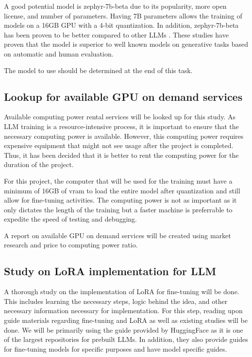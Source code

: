 A good potential model is zephyr-7b-beta due to its popularity, more open license, and number of parameters.
Having 7B parameters allows the training of models on a 16GB GPU with a 4-bit quantization.
In addition, zephyr-7b-beta has been proven to be better compared to other LLMs \cite{Zhu_2023} \cite{zhao2024loraland310finetuned}.
These studies have proven that the model is superior to well known models on generative tasks based on automatic and human evaluation.

The model to use should be determined at the end of this task.

\subsection{Lookup for available GPU on demand services} 
Available computing power rental services will be looked up for this study.
As LLM training is a resource-intensive process, it is important to ensure that the necessary computing power is available.
However, this computing power requires expensive equipment that might not see usage after the project is completed.
Thus, it has been decided that it is better to rent the computing power for the duration of the project.

For this project, the computer that will be used for the training must have a minimum of 16GB of vram to load the entire model after quantization and still allow for fine-tuning activities.
The computing power is not as important as it only dictates the length of the training but a faster machine is preferrable to expedite the speed of testing and debugging.

A report on available GPU on demand services will be created using market research and price to computing power ratio.

\subsection{Study on LoRA implementation for LLM}
A thorough study on the implementation of LoRA for fine-tuning will be done.
This includes learning the necessary steps, logic behind the idea, and other necessary information necessary for implementation.
For this step, reading upon guide materials regarding fine-tuning and LoRA as well as existing studies will be done.
We will be primarily using the guide provided by HuggingFace as it is one of the largest repositories for prebuilt LLMs.
In addition, they also provide guides for fine-tuning models for specific purposes and have model specific guides.

